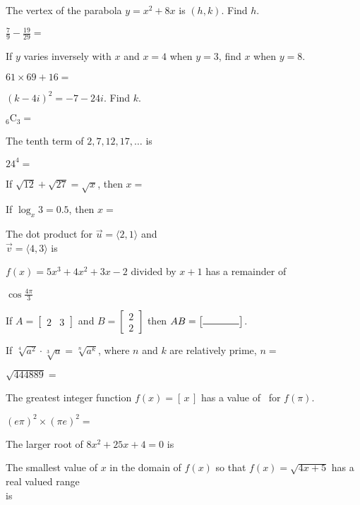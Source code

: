 \documentclass{numbersense}
\begin{document}
\begin{questions}
    \q The vertex of the parabola $y = x^2 +8x$ is $(h, k)$. Find $h$. \ans

    \q $\frac{7}{9} - \frac{19}{29} = $ \ans

    \q If $y$ varies inversely with $x$ and $x = 4$ when $y=3$, find $x$ when
    $y=8$. \ans

    \q $61 \times 69 + 16 = $ \ans

    \q $(k - 4i)^2 = -7 - 24i$. Find $k$. \ans

    \q ${}_6\textrm{C} _3 =$ \ans

    \columnbreak

    \q The tenth term of $2, 7, 12, 17, \ldots$ is \ans

    \aq $24^4= $ \ans

    \q If $\sqrt{12} + \sqrt{27} = \sqrt{x}$, then $x = $\ans

    \q If $\log_x 3 = 0.5$, then $x = $\ans

    \q The dot product for $\vec{u} = \langle 2, 1\rangle$ and \\
    $\vec{v}= \langle 4, 3 \rangle$ is \ans

    \q $f(x) = 5x^3 + 4x^2 + 3x -2$ divided by $x+1$ has a remainder of  \ans

    \q $\cos \frac{4\pi}{3}$ \ans

    \q If $A = \begin{bmatrix}2 & 3 \end{bmatrix} $
    and $B = \begin{bmatrix}  2 \\2 \end{bmatrix}$
    then $AB = \begin{bmatrix} \rule{1.3cm}{0.5pt} \end{bmatrix}$.

    \q  If $\sqrt[4]{a^2} \cdot \sqrt[3]{a} = \sqrt[n]{a^k}$, where
    $n$ and $k$ are relatively prime, $n= $ \ans

    \q $\sqrt{444889} = $ \ans

    \q The greatest integer function $f(x) = [\, x \,]$ has a value of \ans ~for
    $f(\pi)$.

    \aq $(e \pi)^2 \times (\pi e)^2  = $ \ans

    \q The larger root of $8x^2 + 25 x + 4 = 0$ is \ans

    \q The smallest value of $x$ in the domain of $f(x)$ so that
    $f(x) = \sqrt{4x + 5} $ has a real valued range\\ is \ans



\end{questions}
\end{document}
